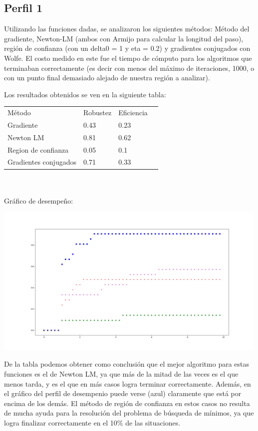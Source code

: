 \documentclass{article}
\begin{document}
\subsection{Perfil 1}

Utilizando las funciones dadas, se analizaron los siguientes métodos: Método del gradiente, Newton-LM (ambos con Armijo para calcular la longitud del paso), región de confianza (con un delta0 = 1 y eta = 0.2) y gradientes conjugados con Wolfe. El costo medido en este fue el tiempo de cómputo para los algoritmos que terminaban correctamente (es decir con menos del máximo de iteraciones, 1000, o con un punto final demasiado alejado de nuestra región a analizar).

Los resultados obtenidos se ven en la siguiente tabla:
\begin{center}
\begin{tabular}{llll}
Método & Robustez & Eficiencia \\
Gradiente & 0.43 & 0.23 \\
Newton LM & 0.81 & 0.62 \\
Region de confianza & 0.05 & 0.1 \\
Gradientes conjugados & 0.71 & 0.33 \\
\end{tabular}
\end{center}
\\
\\
Gráfico de desempeño:

\includegraphics[width=500]{grafico_desempenio_1.png}

De la tabla podemos obtener como conclusión que el mejor algoritmo para estas funciones es el de Newton LM, ya que más de la mitad de las veces es el que menos tarda, y es el que en más casos logra terminar correctamente. Además, en el gráfico del perfil de desempenio puede verse (azul) claramente que está por encima de los demás.
El método de región de confianza en estos casos no resulta de mucha ayuda para la resolución del problema de búsqueda de mínimos, ya que logra finalizar correctamente en el 10\% de las situaciones.
\end{document}
